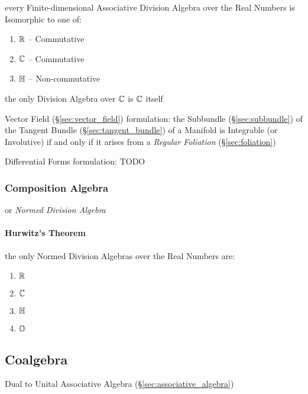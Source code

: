 every Finite-dimensional Associative Division Algebra over the Real Numbers is
Isomorphic to one of:
\begin{enumerate}
  \item $\mathbb{R}$ -- Commutative
  \item $\mathbb{C}$ -- Commutative
  \item $\mathbb{H}$ -- Non-commutative
\end{enumerate}

the only Division Algebra over $\mathbb{C}$ is $\mathbb{C}$ itself

Vector Field (\S\ref{sec:vector_field}) formulation: the Subbundle
(\S\ref{sec:subbundle}) of the Tangent Bundle (\S\ref{sec:tangent_bundle}) of a
Manifold is Integrable (or Involutive) if and only if it arises from a
\emph{Regular Foliation} (\S\ref{sec:foliation})

Differential Forms formulation: TODO



\subsubsection{Composition Algebra}\label{sec:composition_algebra}

or \emph{Normed Division Algebra}



\paragraph{Hurwitz's Theorem}\label{sec:hurwitzs_theorem}\hfill

the only Normed Division Algebras over the Real Numbers are:
\begin{enumerate}
  \item $\mathbb{R}$
  \item $\mathbb{C}$
  \item $\mathbb{H}$
  \item $\mathbb{O}$
\end{enumerate}



\subsection{Coalgebra}\label{sec:coalgebra}

Dual to Unital Associative Algebra (\S\ref{sec:associative_algebra})

